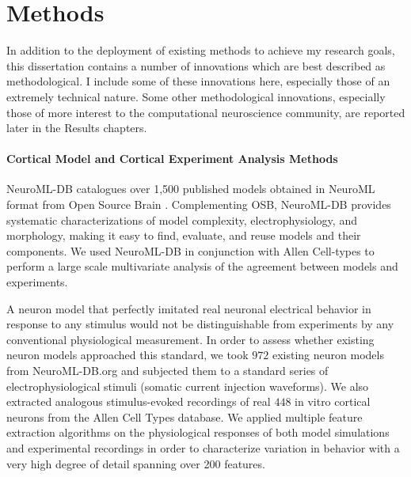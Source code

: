 \chapter{Methods}
In addition to the deployment of existing methods to achieve my research goals, this dissertation contains a number of innovations which are best described as methodological.  I include some of these innovations here, especially those of an extremely technical nature.  Some other methodological innovations, especially those of more interest to the computational neuroscience community, are reported later in the Results chapters.









\subsubsection{Cortical Model and Cortical Experiment Analysis Methods}
NeuroML-DB \cite{birgiolas2016rapid} catalogues over 1,500 published models obtained in NeuroML format from Open Source Brain \cite{gleeson2019open}. Complementing OSB, NeuroML-DB provides systematic characterizations of model complexity, electrophysiology, and morphology, making it easy to find, evaluate, and reuse models and their components. We used NeuroML-DB in conjunction with Allen Cell-types to perform a large scale multivariate analysis of the agreement between models and experiments.

A neuron model that perfectly imitated real neuronal electrical behavior in response to any stimulus would not be distinguishable from experiments by any conventional physiological measurement. In order to assess whether existing neuron models approached this standard, we took $972$ existing neuron models from NeuroML-DB.org and subjected them to a standard series of electrophysiological stimuli (somatic current injection waveforms). We also extracted analogous stimulus-evoked recordings of real $448$ in vitro cortical neurons from the Allen Cell Types database. We applied multiple feature extraction algorithms on the physiological responses of both model simulations and experimental recordings in order to characterize variation in behavior with a very high degree of detail spanning over 200 features.
